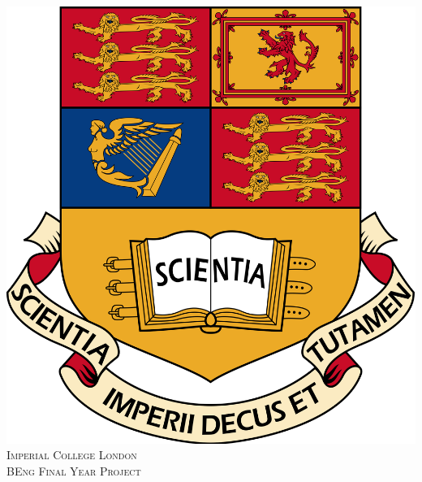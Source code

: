 \documentclass[twoside,openright]{article}
\begin{document}

\begin{titlepage}

\newcommand{\HRule}{\rule{\linewidth}{0.5mm}} %

\center %
 

\includegraphics[scale=0.05]{logo.png}\\[1cm] 


 

\textsc{\LARGE Imperial College London}\\[1.5cm]
\textsc{\Large BEng Final Year Project}\\[0.5cm] 


\end{titlepage}
\end{document}
